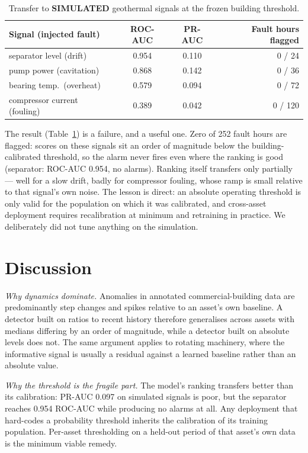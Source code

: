 \documentclass[conference]{IEEEtran}
\newcommand{\simnote}{\textbf{SIMULATED}}
\begin{document}
\begin{table}[t]
\centering
\caption{Transfer to \simnote{} geothermal signals at the frozen building threshold.}
\label{tab:sim}
\footnotesize
\setlength{\tabcolsep}{4pt}
\begin{tabular}{lccr}
\toprule
Signal (injected fault) & ROC-AUC & PR-AUC & Fault hours flagged \\
\midrule
separator level (drift) & 0.954 & 0.110 & 0 / 24 \\
pump power (cavitation) & 0.868 & 0.142 & 0 / 36 \\
bearing temp.\ (overheat) & 0.579 & 0.094 & 0 / 72 \\
compressor current (fouling) & 0.389 & 0.042 & 0 / 120 \\
\bottomrule
\end{tabular}
\end{table}

The result (Table~\ref{tab:sim}) is a failure, and a useful one. Zero of 252 fault hours are flagged:
scores on these signals sit an order of magnitude below the building-calibrated threshold, so the alarm
never fires even where the ranking is good (separator: ROC-AUC 0.954, no alarms). Ranking itself
transfers only partially --- well for a slow drift, badly for compressor fouling, whose ramp is small
relative to that signal's own noise. The lesson is direct: an absolute operating threshold is only
valid for the population on which it was calibrated, and cross-asset deployment requires
recalibration at minimum and retraining in practice. We deliberately did not tune anything on the
simulation.

\section{Discussion}

\emph{Why dynamics dominate.} Anomalies in annotated commercial-building data are predominantly step
changes and spikes relative to an asset's own baseline. A detector built on ratios to recent history
therefore generalises across assets with medians differing by an order of magnitude, while a detector
built on absolute levels does not. The same argument applies to rotating machinery, where the
informative signal is usually a residual against a learned baseline rather than an absolute value.

\emph{Why the threshold is the fragile part.} The model's ranking transfers better than its
calibration: PR-AUC 0.097 on simulated signals is poor, but the separator reaches 0.954 ROC-AUC while
producing no alarms at all. Any deployment that hard-codes a probability threshold inherits the
calibration of its training population. Per-asset thresholding on a held-out period of that asset's
own data is the minimum viable remedy.
\end{document}

